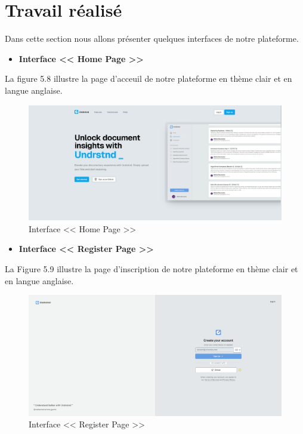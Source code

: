 \newpage
\section{Travail réalisé }
Dans cette section nous allons présenter quelques interfaces de notre plateforme.
\begin{itemize}
    \item \textbf{Interface << Home Page >>}
\end{itemize}
La figure 5.8 illustre la page d'acceuil de notre plateforme en thème clair et en langue anglaise.
\begin{figure}[H]
    \centering
    \includegraphics[width=1.1\textwidth,height=0.45\textwidth]{images/chp5/fig8.png}
    \caption{Interface << Home Page >>}
    \label{Interface << Home Page >>}    
\end{figure} 
\begin{itemize}
    \item \textbf{Interface << Register Page >>}
\end{itemize}
La Figure 5.9 illustre la page d'inscription de notre plateforme en thème clair et en langue anglaise.
\begin{figure}[H]
    \centering
    \includegraphics[width=1.1\textwidth,height=0.45\textwidth]{images/chp5/fig9.png}
    \caption{Interface << Register Page >>}
    \label{Interface << Register Page >>}    
\end{figure}
